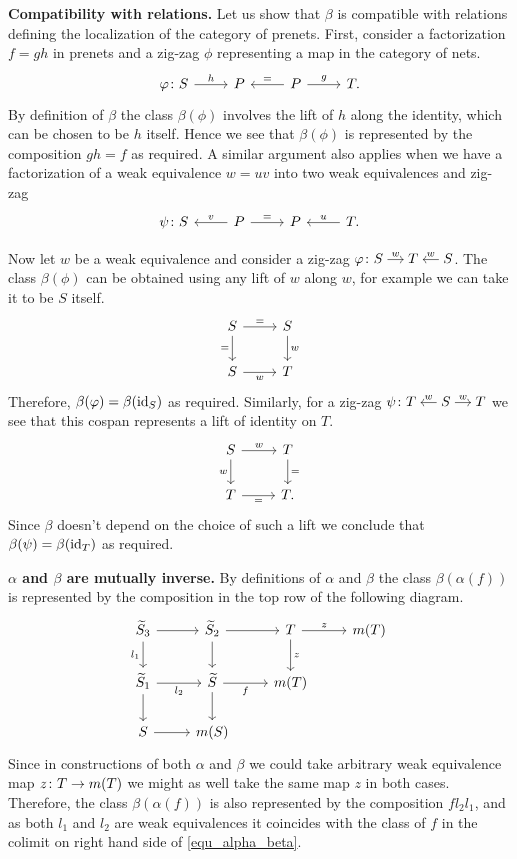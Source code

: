 \documentclass[letterpaper,12pt,leqno]{article}
\numberwithin{equation}{theorem}
\begin{document}
{\bf Compatibility with relations.} Let us show that $\beta$ is compatible with relations defining the localization of the category of prenets. First, consider
a factorization $f = gh$ in prenets and a zig-zag $\phi$ representing a map in the category of nets.
$$
\begin{tikzcd}
\phi\from S \ar[r, "h"] & P & P \ar[l, "="'] \ar[r, "g"] & T.
\end{tikzcd}
$$
By definition of $\beta$ the class $\beta(\phi)$ involves the lift of $h$ along the identity, which can be chosen to be $h$ itself. Hence we see that $\beta(\phi)$ is
represented by the composition $gh = f$ as required.
A similar argument also applies when we have a factorization of a weak equivalence $w = uv$ into two weak equivalences and zig-zag
$$
\begin{tikzcd}
\psi\from S & P \ar[l, "v"'] \ar[r, "="] & P & T \ar[l, "u"'].
\end{tikzcd}
$$

Now let $w$ be a weak equivalence and consider a zig-zag $\begin{tikzcd}[cramped,sep=small] \phi\from S \ar[r, "w"] & T & S \ar[l, "w"'] \end{tikzcd}$.
The class $\beta(\phi)$ can be obtained using any lift of $w$ along $w$, for example we can take it to be $S$ itself.
$$
\begin{tikzcd}
S \ar[d, "="'] \ar[r, "="] & S \ar[d, "w"] \\
S \ar[r, "w"'] & T
\end{tikzcd}
$$
Therefore, $\beta(\varphi) = \beta(\mathrm{id}_S)$ as required. Similarly, for a zig-zag $\begin{tikzcd}[cramped,sep=small] \psi\from T & \ar[l, "w"'] S \ar[r, "w"] & T \end{tikzcd}$
we see that this cospan represents a lift of identity on $T$.
$$
\begin{tikzcd}
S \ar[d, "w"'] \ar[r, "w"] & T \ar[d, "="] \\
T \ar[r, "="'] & T.
\end{tikzcd}
$$
Since $\beta$ doesn't depend on the choice of such a lift we conclude that $\beta(\psi) = \beta(\mathrm{id}_T)$ as required.

{\bf $\alpha$ and $\beta$ are mutually inverse.} By definitions of $\alpha$ and $\beta$ the class $\beta(\alpha(f))$ is represented by the composition in the top row of the following diagram.
$$
\begin{tikzcd}
\wtilde S_3 \ar[d, "l_1"'] \ar[r] & \wtilde S_2 \ar[d] \ar[r] & T \ar[d, "z"] \ar[r, "z"] & m(T) \\
\wtilde S_1 \ar[d] \ar[r, "l_2"'] & \wtilde S \ar[d] \ar[r, "f"'] & m(T) & \\
S \ar[r] & m(S) & &
\end{tikzcd}
$$
Since in constructions of both $\alpha$ and $\beta$ we could take arbitrary weak equivalence map $z\colon T \to m(T)$ we might as well take the same map $z$ in both cases. Therefore, the class $\beta(\alpha(f))$ is also represented by
the composition $f l_2 l_1$, and as both $l_1$ and $l_2$ are weak equivalences it coincides with the class of $f$ in the colimit on right hand side of \ref{equ_alpha_beta}.
\end{document}
